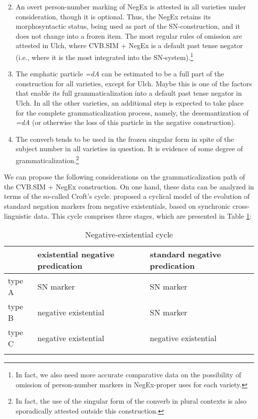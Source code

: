 \documentclass[output=paper]{langscibook}
\begin{document}
\begin{enumerate}
    \setcounter{enumi}{1}
    \item An overt person-number marking of NegEx is attested in all varieties under consideration, though it is optional. Thus, the NegEx retains its morphosyntactic status, being used as part of the SN-construction, and it does not change into a frozen item. The most regular rules of omission are attested in Ulch, where CVB.SIM + NegEx is a default past tense negator (i.e., where it is the most integrated into the SN-system).\footnote{In fact, we also need more accurate comparative data on the possibility of omission of person-number markers in NegEx-proper uses for each variety.}
    \item The emphatic particle \textit{=dA} can be estimated to be a full part of the construction for all varieties, except for Ulch. Maybe this is one of the factors that enable its full grammaticalization into a default past tense negator in Ulch. In all the other varieties, an additional step is expected to take place for the complete grammaticalization process, namely, the desemantization of \textit{=dA} (or otherwise the loss of this particle in the negative construction).
    \item The converb tends to be used in the frozen singular form in spite of the subject number in all varieties in question. It is evidence of some degree of grammaticalization.\footnote{In fact, the use of the singular form of the converb in plural contexts is also sporadically attested outside this construction.}
\end{enumerate}

We can propose the following considerations on the grammaticalization path of the CVB.SIM + NegEx construction. On one hand, these data can be analyzed in terms of the so-called Croft’s cycle. \citet{Croft1991} proposed a cyclical model of the evolution of standard negation markers from negative existentials, based on synchronic cross-linguistic data. This cycle comprises three stages, which are presented in Table \ref{tab:T9}:

\begin{table}[!h]
    \caption{Negative-existential cycle \citep{Croft1991}}
    \label{tab:T9}
    \begin{tabular}{@{}lll@{}}
    \lsptoprule
     & existential negative predication & standard negative predication \\ \midrule
    type A & SN marker & SN marker \\
    type B & negative existential & SN marker \\
    type C & negative existential & negative existential\footnotemark \\ \lspbottomrule
    \end{tabular}
\end{table}
\end{document}
